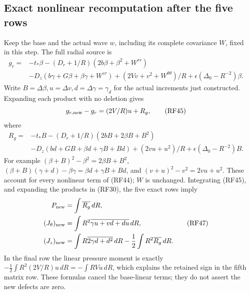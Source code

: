\documentclass[10pt,a4paper]{article}
\begin{document}
\subsection{Exact nonlinear recomputation after the five rows}

Keep the base and the actual wave \(w\), including its complete
covariance \(W\), fixed in this step. The full radial source is
\[
\begin{split}
g_r={}&-t_*\beta-(D_r+1/R)(2b\beta+\beta^2+W^{rr})\\
&-D_z(b\gamma+G\beta+\beta\gamma+W^{zr})
+(2Vv+v^2+W^{\theta\theta})/R
+\epsilon(\Delta_0-R^{-2})\beta.
\end{split}
\tag{RF44}
\]
Write \(B=\Delta\beta,u=\Delta v,d=\Delta\gamma=\gamma_d\)
for the actual increments just constructed. Expanding each product
with no deletion gives
\[
g_{r,\rm new}-g_r=(2V/R)u+R_g,
\tag{RF45}
\]
where
\[
\begin{split}
R_g={}&-t_*B-(D_r+1/R)(2bB+2\beta B+B^2)\\
&-D_z(bd+GB+\beta d+\gamma B+Bd)
+(2vu+u^2)/R+\epsilon(\Delta_0-R^{-2})B.
\end{split}
\tag{RF46}
\]
For example \((\beta+B)^2-\beta^2=2\beta B+B^2\),
\((\beta+B)(\gamma+d)-\beta\gamma=\beta d+\gamma B+Bd\),
and \((v+u)^2-v^2=2vu+u^2\). These account for every nonlinear
term of (RF44); \(W\) is unchanged. Integrating (RF45), and
expanding the products in (RF30), the five exact rows imply
\[
\begin{split}
P_{\rm new}&=\int\overline{R_g}\,dR,\\
(J_\theta)_{\rm new}&=\int R^2\overline{\gamma u+vd+du}\,dR,\\
(J_z)_{\rm new}&=\int R\overline{2\gamma d+d^2}\,dR
-\frac12\int R^2\overline{R_g}\,dR.
\end{split}
\tag{RF47}
\]
In the final row the linear pressure moment is exactly
\(-\tfrac12\int R^2(2V/R)u\,dR=-\int RVu\,dR\),
which explains the retained sign in the fifth matrix row. These formulas
cancel the base-linear terms; they do not assert the new defects are zero.
\end{document}
